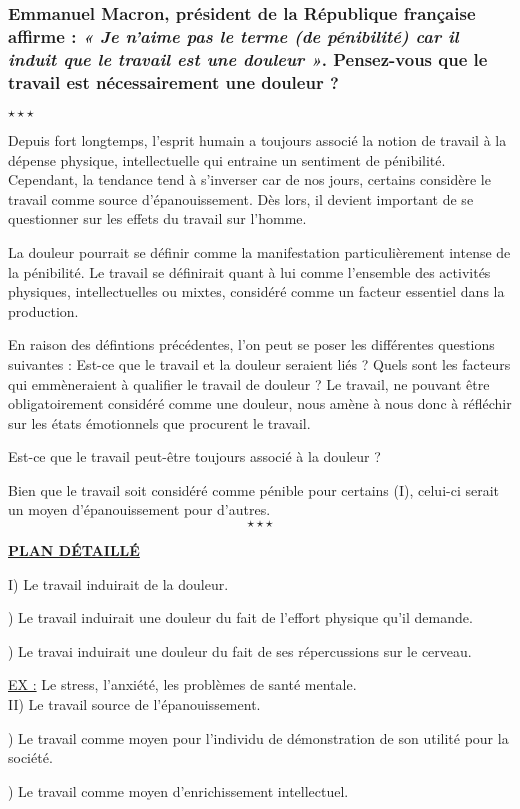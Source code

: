 \newpage \begin{center}
	\subsubsection*{Emmanuel Macron, président de la République française affirme : \textit{« Je n’aime pas le terme (de pénibilité) car il induit que le travail est une douleur »}. Pensez-vous que le travail est nécessairement une douleur ? }
	$\star \star \star$
\end{center}

Depuis fort longtemps, l'esprit humain a toujours associé la notion de travail à la dépense physique, intellectuelle qui entraine un sentiment de pénibilité. Cependant, la tendance tend à s'inverser car de nos jours, certains considère le travail comme source d'épanouissement. Dès lors, il devient important de se questionner sur les effets du travail sur l'homme.

La douleur pourrait se définir comme la manifestation particulièrement intense de la pénibilité. Le travail se définirait quant à lui comme l'ensemble des activités physiques, intellectuelles ou mixtes, considéré comme un facteur essentiel dans la production.

En raison des défintions précédentes, l'on peut se poser les différentes questions suivantes : Est-ce que le travail et la douleur seraient liés ? Quels sont les facteurs qui emmèneraient à qualifier le travail de douleur ? Le travail, ne pouvant être obligatoirement considéré comme une douleur, nous amène à nous donc à réfléchir sur les états émotionnels que procurent le travail.

Est-ce que le travail peut-être toujours associé à la douleur ?

Bien que le travail soit considéré comme pénible pour certains (I), celui-ci serait un moyen d'épanouissement pour d'autres.
$$\star \star \star$$

\begin{center}
	\textbf{\underline{PLAN D\'ETAILL\'E}}
\end{center}
\noindent I) Le travail induirait de la douleur.

) Le travail induirait une douleur du fait de l'effort physique qu'il demande.

) Le travai induirait une douleur du fait de ses répercussions sur le cerveau.

\indent \indent \underline{EX :} Le stress, l'anxiété, les problèmes de santé mentale.\\

\noindent II) Le travail source de l'épanouissement.

) Le travail comme moyen pour l'individu de démonstration de son utilité pour la société.

) Le travail comme moyen d'enrichissement intellectuel.

